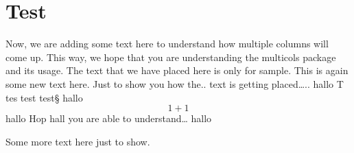 \documentclass[twocolumn]{article}
\begin{document}
\section{Test}
Now, we are adding some text here to understand how multiple columns will come up.
This way, we hope that you are understanding the multicols package and its usage.
The text that we have placed here is only for sample.
This is again some new text here. Just to show you how the..
text is getting placed…..
hallo
T
tes
test
test§
hallo
\begin{equation}
    1+1
\end{equation}
hallo
Hop
hall
you are able to understand… hallo
 
Some more text here just to show.
 
\end{document}
